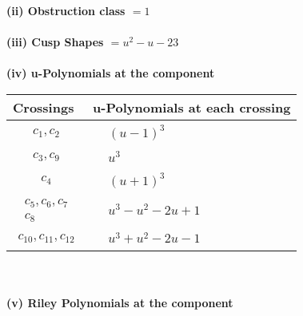 \documentclass[1p]{elsarticle_modified}
\theoremstyle{definition}
\begin{document}
\flushleft \textbf{(ii) Obstruction class $= 1$}\\~\\
\flushleft \textbf{(iii) Cusp Shapes $= u^2- u-23$}\\~\\
\newpage\renewcommand{\arraystretch}{1}
\flushleft \textbf{(iv) u-Polynomials at the component}\newline \\
\begin{tabular}{m{50pt}|m{274pt}}
Crossings & \hspace{64pt}u-Polynomials at each crossing \\
\hline $$\begin{aligned}c_{1},c_{2}\end{aligned}$$&$\begin{aligned}
&(u-1)^3
\end{aligned}$\\
\hline $$\begin{aligned}c_{3},c_{9}\end{aligned}$$&$\begin{aligned}
&u^3
\end{aligned}$\\
\hline $$\begin{aligned}c_{4}\end{aligned}$$&$\begin{aligned}
&(u+1)^3
\end{aligned}$\\
\hline $$\begin{aligned}c_{5},c_{6},c_{7}\\c_{8}\end{aligned}$$&$\begin{aligned}
&u^3- u^2-2 u+1
\end{aligned}$\\
\hline $$\begin{aligned}c_{10},c_{11},c_{12}\end{aligned}$$&$\begin{aligned}
&u^3+u^2-2 u-1
\end{aligned}$\\
\hline
\end{tabular}\\~\\
\newpage\renewcommand{\arraystretch}{1}
\flushleft \textbf{(v) Riley Polynomials at the component}\newline \\
\end{document}
